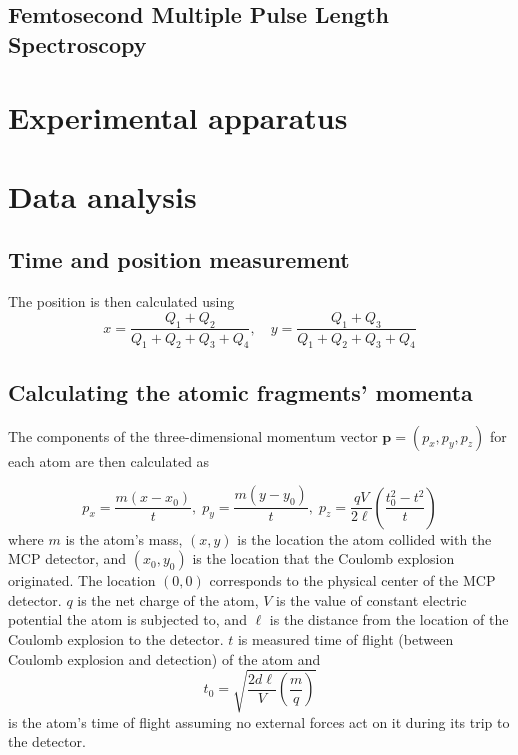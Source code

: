 \subsection{Femtosecond Multiple Pulse Length Spectroscopy}

\section{Experimental apparatus}

\section{Data analysis}

\subsection{Time and position measurement}
The position is then calculated using
\begin{equation}
x = \frac{Q_1 + Q_2}{Q_1 + Q_2 + Q_3 + Q_4} ,\quad
y = \frac{Q_1 + Q_3}{Q_1 + Q_2 + Q_3 + Q_4}
\end{equation}

\subsection{Calculating the atomic fragments' momenta}
The components of the three-dimensional momentum vector $\mathbf{p} = (p_x,p_y,p_z)$ for each atom are then calculated as

\begin{equation}\label{eq:CEImomenta}
p_x = \frac{m(x-x_0)}{t} ,\;
p_y = \frac{m(y-y_0)}{t} ,\;
p_z = \frac{qV}{2\ell} \left( \frac{t_0^2 - t^2}{t} \right)
\end{equation}
where $m$ is the atom's mass, $(x,y)$ is the location the atom collided with the MCP detector, and $(x_0,y_0)$ is the location that the Coulomb explosion originated. The location $(0,0)$ corresponds to the physical center of the MCP detector. $q$ is the net charge of the atom, $V$ is the value of constant electric potential the atom is subjected to, and $\ell$ is the distance from the location of the Coulomb explosion to the detector. $t$ is measured time of flight (between Coulomb explosion and detection) of the atom and 
\begin{equation}
t_0 = \sqrt{\frac{2d\ell}{V} \left( \frac{m}{q} \right)}
\end{equation}
is the atom's time of flight assuming no external forces act on it during its trip to the detector.

